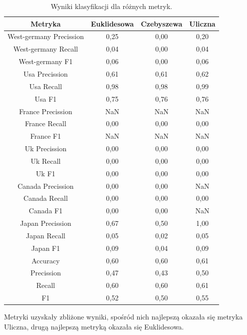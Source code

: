\documentclass{classrep}
\begin{document}
\newpage
\begin{table}[h!]
\caption{Wyniki klasyfikacji dla różnych metryk.}
\centering
\vspace{0.1cm}
 \begin{tabular}{c c c c}

    \textbf{Metryka} & \textbf{Euklidesowa}   & \textbf{Czebyszewa}  & \textbf{Uliczna}  \\

\hline
West-germany Precission 	& 0,25 & 0,00 & 0,20 \\
West-germany Recall 		& 0,04 & 0,00 & 0,04 \\
West-germany F1		& 0,06 & 0,00 & 0,06 \\
\hline
Usa Precission 			& 0,61 & 0,61 & 0,62 \\
Usa Recall				& 0,98 & 0,98 & 0,99 \\
Usa F1			 	& 0,75 & 0,76 & 0,76 \\
\hline
France Precission 		& NaN & NaN & NaN \\
France Recall 			& 0,00 & 0,00 & 0,00 \\
France F1 				& NaN & NaN & NaN \\
\hline
Uk Precission 			& 0,00 & 0,00 & 0,00 \\
Uk Recall 				& 0,00 & 0,00 & 0,00 \\
Uk F1 				& 0,00 & 0,00 & 0,00 \\
\hline
Canada Precission		& 0,00 & 0,00 & NaN \\
Canada Recall 			& 0,00 & 0,00 & 0,00 \\
Canada F1 			& 0,00 & 0,00 & NaN \\
\hline
Japan Precission 		& 0,67 & 0,50 & 1,00 \\
Japan Recall 			& 0,05 & 0,02 & 0,05 \\
Japan F1 				& 0,09 & 0,04 & 0,09 \\
\hline
Accuracy 				& 0,60 & 0,60 & 0,61 \\
Precission 				& 0,47 & 0,43 & 0,50 \\
Recall 				& 0,60 & 0,60 & 0,61 \\
F1 					& 0,52 & 0,50 & 0,55 \\

\end {tabular}
\label {Wyniki klasyfikacji dla różnych metryk.}
\end{table}


Metryki uzyskały zbliżone wyniki, spośród nich najlepszą okazała się metryka Uliczna, drugą najlepszą metryką okazała się Euklidesowa. \\
\end{document}
